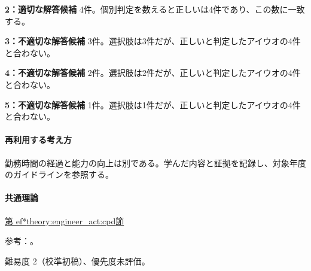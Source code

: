 \noindent\textbf{2：適切な解答候補} 4件。個別判定を数えると正しいは4件であり、この数に一致する。\par

\noindent\textbf{3：不適切な解答候補} 3件。選択肢は3件だが、正しいと判定したアイウオの4件と合わない。\par

\noindent\textbf{4：不適切な解答候補} 2件。選択肢は2件だが、正しいと判定したアイウオの4件と合わない。\par

\noindent\textbf{5：不適切な解答候補} 1件。選択肢は1件だが、正しいと判定したアイウオの4件と合わない。\par

\paragraph{再利用する考え方} 勤務時間の経過と能力の向上は別である。学んだ内容と証拠を記録し、対象年度のガイドラインを参照する。

\paragraph{共通理論} \hyperref[theory:engineer_act:cpd]{第
ef*{theory:engineer_act:cpd}節}

\par 参考：\cite{cpd_new2021,cpd_v3}。

\par 難易度 2（校準初稿）、優先度未評価。
